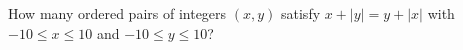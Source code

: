 How many ordered pairs of integers $(x,y)$ satisfy $x+|y|=y+|x|$ with $-10\le x\le10$ and $-10\le y\le10$?
